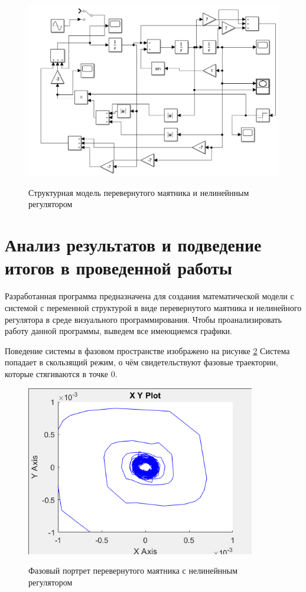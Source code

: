 \begin{figure}[h!]
\begin{center}
\includegraphics[angle=0,width=17cm]{fig/01.png}\\[2mm]
\caption{Структурная модель перевернутого маятника и нелинейнным регулятором}\label{fig:02}
\end{center}
\end{figure}

\section{Анализ результатов и подведение итогов в проведенной работы}

Разработанная программа предназначена для  создания математической модели с системой с переменной структурой в виде перевернутого маятника и нелинейного регулятора в среде визуального программирования. Чтобы проанализировать работу данной программы, выведем все имеющиемся графики.

Поведение системы в фазовом пространстве изображено на рисунке \ref{fig:05} Система попадает в скользящий режим, о чём свидетельствуют фазовые траектории, которые стягиваются в точке 0.

 \begin{figure}[h!]
\begin{center}
\includegraphics[angle=0,width=10cm]{fig/05.png}\\[2mm]
\caption{Фазовый портрет перевернутого маятника с нелинейнным регулятором}\label{fig:05}
\end{center}
\end{figure}

